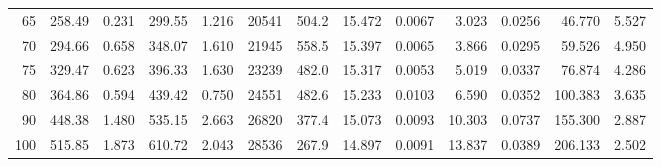 \documentclass[10pt]{article}
\begin{document}
{\begin{tabular}{|r|rr|rr|rr|rr|rr|r|r|}
       65 &       258.49 &        0.231 &       299.55 &        1.216 &        20541 &        504.2 &       15.472 &       0.0067 &        3.023 &       0.0256 &       46.770 &        5.527 \\
       70 &       294.66 &        0.658 &       348.07 &        1.610 &        21945 &        558.5 &       15.397 &       0.0065 &        3.866 &       0.0295 &       59.526 &        4.950 \\
       75 &       329.47 &        0.623 &       396.33 &        1.630 &        23239 &        482.0 &       15.317 &       0.0053 &        5.019 &       0.0337 &       76.874 &        4.286 \\
       80 &       364.86 &        0.594 &       439.42 &        0.750 &        24551 &        482.6 &       15.233 &       0.0103 &        6.590 &       0.0352 &      100.383 &        3.635 \\
       90 &       448.38 &        1.480 &       535.15 &        2.663 &        26820 &        377.4 &       15.073 &       0.0093 &       10.303 &       0.0737 &      155.300 &        2.887 \\
      100 &       515.85 &        1.873 &       610.72 &        2.043 &        28536 &        267.9 &       14.897 &       0.0091 &       13.837 &       0.0389 &      206.133 &        2.502 \\
\hline
\end{tabular}
}







\pagebreak
\end{document}

